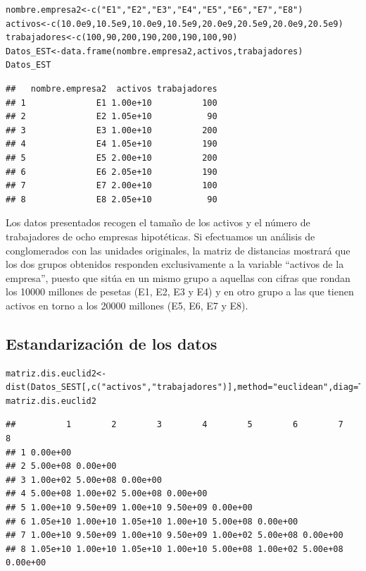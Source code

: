 \documentclass[]{article}
\begin{document}
\hypertarget{left}{}
\begin{verbatim}
nombre.empresa2<-c("E1","E2","E3","E4","E5","E6","E7","E8")
activos<-c(10.0e9,10.5e9,10.0e9,10.5e9,20.0e9,20.5e9,20.0e9,20.5e9)
trabajadores<-c(100,90,200,190,200,190,100,90)
Datos_EST<-data.frame(nombre.empresa2,activos,trabajadores)
Datos_EST
\end{verbatim}

\begin{verbatim}
##   nombre.empresa2  activos trabajadores
## 1              E1 1.00e+10          100
## 2              E2 1.05e+10           90
## 3              E3 1.00e+10          200
## 4              E4 1.05e+10          190
## 5              E5 2.00e+10          200
## 6              E6 2.05e+10          190
## 7              E7 2.00e+10          100
## 8              E8 2.05e+10           90
\end{verbatim}

\hypertarget{right}{}
Los datos presentados recogen el tamaño de los activos y el número de
trabajadores de ocho empresas hipotéticas. Si efectuamos un análisis de
conglomerados con las unidades originales, la matriz de distancias
mostrará que los dos grupos obtenidos responden exclusivamente a la
variable ``activos de la empresa'', puesto que sitúa en un mismo grupo a
aquellas con cifras que rondan los 10000 millones de pesetas (E1, E2, E3
y E4) y en otro grupo a las que tienen activos en torno a los 20000
millones (E5, E6, E7 y E8).

\subsection{Estandarización de los
datos}\label{estandarizaciuxf3n-de-los-datos-2}

\hypertarget{left}{}
\begin{verbatim}
matriz.dis.euclid2<-dist(Datos_SEST[,c("activos","trabajadores")],method="euclidean",diag=TRUE)
matriz.dis.euclid2
\end{verbatim}

\begin{verbatim}
##          1        2        3        4        5        6        7        8
## 1 0.00e+00                                                               
## 2 5.00e+08 0.00e+00                                                      
## 3 1.00e+02 5.00e+08 0.00e+00                                             
## 4 5.00e+08 1.00e+02 5.00e+08 0.00e+00                                    
## 5 1.00e+10 9.50e+09 1.00e+10 9.50e+09 0.00e+00                           
## 6 1.05e+10 1.00e+10 1.05e+10 1.00e+10 5.00e+08 0.00e+00                  
## 7 1.00e+10 9.50e+09 1.00e+10 9.50e+09 1.00e+02 5.00e+08 0.00e+00         
## 8 1.05e+10 1.00e+10 1.05e+10 1.00e+10 5.00e+08 1.00e+02 5.00e+08 0.00e+00
\end{verbatim}
\end{document}
